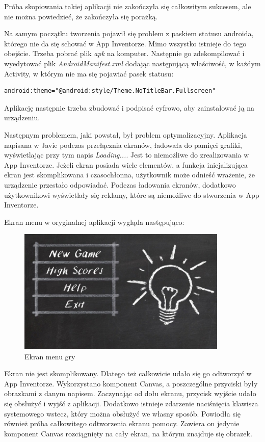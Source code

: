 Próba skopiowania takiej aplikacji nie zakończyła się całkowitym sukcesem, ale nie można powiedzieć, że zakończyła się porażką.

Na samym początku tworzenia pojawił się problem z paskiem statusu androida, którego nie da się schować w App Inventorze. Mimo wszystko istnieje do tego obejście. Trzeba pobrać plik \emph{apk} na komputer. Następnie go zdekompilować i wyedytować plik \emph{AndroidManifest.xml} dodając następującą właściwość, w każdym Activity, w którym nie ma się pojawiać pasek statusu:
\begin{lstlisting}
android:theme="@android:style/Theme.NoTitleBar.Fullscreen"
\end{lstlisting}
Aplikację następnie trzeba zbudować i podpisać cyfrowo, aby zainstalować ją na urządzeniu.

Następnym problemem, jaki powstał, był problem optymalizacyjny. Aplikacja napisana w Javie podczas przełącznia ekranów, ładowała do pamięci grafiki, wyświetlając przy tym napis \emph{Loading...}. Jest to niemożliwe do zrealizowania w App Inventorze. Jeżeli ekran posiada wiele elementów, a funkcja inicjalizująca ekran jest skomplikowana i czasochłonna, użytkownik może odnieść wrażenie, że urządzenie przestało odpowiadać. Podczas ładowania ekranów, dodatkowo użytkownikowi wyświetlały się reklamy, które są niemożliwe do stworzenia w App Inventorze.

Ekran menu w oryginalnej aplikacji wygląda następująco:

\begin{figure}[H]
\centering\includegraphics[width=10cm]{figures/apps/thinkfaster_menu}
\caption{Ekran menu gry}
\end{figure}

Ekran nie jest skomplikowany. Dlatego też całkowicie udało się go odtworzyć w App Inventorze. Wykorzystano komponent Canvas, a poszczególne przyciski były obrazkami z danym napisem. Zaczynając od dołu ekranu, przycisk wyjście udało się obsłużyć i wyjść z aplikacji. Dodatkowo istnieje zdarzenie naciśnięcia klawisza systemowego wstecz, który można obsłużyć we własny sposób. Powiodła się również próba całkowitego odtworzenia ekranu pomocy. Zawiera on jedynie komponent Canvas rozciągnięty na cały ekran, na którym znajduje się obrazek.

